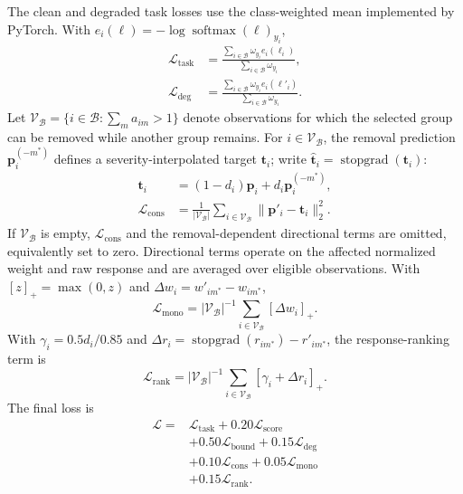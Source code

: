\documentclass[11pt]{article}
\begin{document}
The clean and degraded task losses use the class-weighted mean implemented by PyTorch. With $e_i(\boldsymbol\ell)=-\log\operatorname{softmax}(\boldsymbol\ell)_{y_i}$,
\begin{equation}
\begin{aligned}
\mathcal L_{\mathrm{task}}&=
\frac{\sum_{i\in\mathcal B}\omega_{y_i}e_i(\boldsymbol\ell_i)}
{\sum_{i\in\mathcal B}\omega_{y_i}},\\
\mathcal L_{\mathrm{deg}}&=
\frac{\sum_{i\in\mathcal B}\omega_{y_i}e_i(\boldsymbol\ell'_i)}
{\sum_{i\in\mathcal B}\omega_{y_i}}.
\end{aligned}
\label{eq:task-losses}
\end{equation}
Let $\mathcal V_{\mathcal B}=\{i\in\mathcal B:\sum_m a_{im}>1\}$ denote observations for which the selected group can be removed while another group remains. For $i\in\mathcal V_{\mathcal B}$, the removal prediction $\mathbf p_i^{(-m^*)}$ defines a severity-interpolated target $\mathbf t_i$; write $\widehat{\mathbf t}_i=\operatorname{stopgrad}(\mathbf t_i)$:
\begin{equation}
\begin{aligned}
\mathbf t_i&=(1-d_i)\mathbf p_i+d_i\mathbf p_i^{(-m^*)},\\
\mathcal L_{\mathrm{cons}}&=\frac{1}{|\mathcal V_{\mathcal B}|}
\sum_{i\in\mathcal V_{\mathcal B}}
\|\mathbf p'_i-\widehat{\mathbf t}_i\|_2^2.
\end{aligned}
\end{equation}
If $\mathcal V_{\mathcal B}$ is empty, $\mathcal L_{\mathrm{cons}}$ and the removal-dependent directional terms are omitted, equivalently set to zero. Directional terms operate on the affected normalized weight and raw response and are averaged over eligible observations. With $[z]_+=\max(0,z)$ and $\Delta w_i=w'_{im^*}-w_{im^*}$,
\begin{equation}
\mathcal L_{\mathrm{mono}}=|\mathcal V_{\mathcal B}|^{-1}
\sum_{i\in\mathcal V_{\mathcal B}}[\Delta w_i]_+.
\end{equation}
With $\gamma_i=0.5d_i/0.85$ and $\Delta r_i=\operatorname{stopgrad}(r_{im^*})-r'_{im^*}$, the response-ranking term is
\begin{equation}
\mathcal L_{\mathrm{rank}}=|\mathcal V_{\mathcal B}|^{-1}
\sum_{i\in\mathcal V_{\mathcal B}}[\gamma_i+\Delta r_i]_+.
\end{equation}
The final loss is
\begin{equation}
\begin{aligned}
\mathcal L={}&\mathcal L_{\mathrm{task}}+0.20\mathcal L_{\mathrm{score}}\\
&+0.50\mathcal L_{\mathrm{bound}}+0.15\mathcal L_{\mathrm{deg}}\\
&+0.10\mathcal L_{\mathrm{cons}}+0.05\mathcal L_{\mathrm{mono}}\\
&+0.15\mathcal L_{\mathrm{rank}}.
\end{aligned}
\label{eq:objective}
\end{equation}
\end{document}
